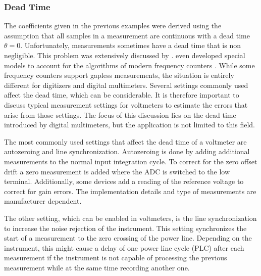 \subsubsection{Dead Time}%
\label{sec:dead_time}
The coefficients given in the previous examples were derived using the assumption that all samples in a measurement are continuous with a dead time $\theta = 0$. Unfortunately, measurements sometimes have a dead time that is non negligible. This problem was extensively discussed by \citeauthor{psd_to_adev} \cite{psd_to_adev}. \citeauthor{adev_frequency_counter} even developed special models to account for the algorithms of modern frequency counters \cite{adev_frequency_counter}. While some frequency counters support gapless measurements, the situation is entirely different for digitizers and digital multimeters. Several settings commonly used affect the dead time, which can be considerable. It is therefore important to discuss typical measurement settings for voltmeters to estimate the errors that arise from those settings. The focus of this discussion lies on the dead time introduced by digital multimeters, but the application is not limited to this field.

The most commonly used settings that affect the dead time of a voltmeter are autozeroing and line synchronization. Autozeroing is done by adding additional measurements to the normal input integration cycle. To correct for the zero offset drift a zero measurement is added where the ADC is switched to the low terminal. Additionally, some devices add a reading of the reference voltage to correct for gain errors. The implementation details and type of measurements are manufacturer dependent.

The other setting, which can be enabled in voltmeters, is the line synchronization to increase the noise rejection of the instrument. This setting synchronizes the start of a measurement to the zero crossing of the power line. Depending on the instrument, this might cause a delay of one power line cycle (PLC) after each measurement if the instrument is not capable of processing the previous measurement while at the same time recording another one.

